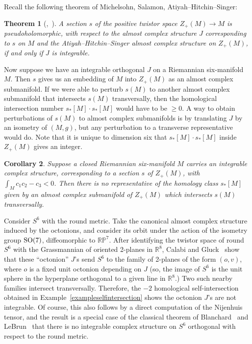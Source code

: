 \documentclass[pdftex]{sigma}%
\newcommand{\R}{\mathbb{R}}
\newcommand{\RP}{\mathbb{RP}}
\numberwithin{equation}{section}
\newtheorem{Theorem}{Theorem}[section]
\newtheorem{Corollary}[Theorem]{Corollary}
\begin{document}
Recall the following theorem of Michelsohn, Salamon, Atiyah--Hitchin--Singer:

\begin{Theorem}[{\cite[Theorem~9.11]{LM}\label{sectiontheorem},~\cite[Theorem~1]{Sa95}}] A section $s$ of the positive twistor space $Z_+(M) \to M$ is pseudoholomorphic, with respect to the almost complex structure $J$ corresponding to $s$ on $M$ and the Atiyah--Hitchin--Singer almost complex structure on $Z_+(M)$, if and only if $J$ is integrable. \end{Theorem}

Now suppose we have an integrable orthogonal $J$ on a Riemannian six-manifold $M$. Then $s$ gives us an embedding of $M$ into $Z_+(M)$ as an almost complex submanifold. If we were able to perturb $s(M)$ to another almost complex submanifold that intersects $s(M)$ transversally, then the homological intersection number $s_*[M] \cdot s_*[M]$ would have to be $\geq 0$. A way to obtain perturbations of $s(M)$ to almost complex submanifolds is by translating $J$ by an isometry of $(M,g)$, but any perturbation to a transverse representative would do. Note that it is unique to dimension six that $s_*[M] \cdot s_*[M]$ inside $Z_+(M)$ gives an integer.

\begin{Corollary}\label{deform} Suppose a closed Riemannian six-manifold $M$ carries an integrable complex structure, corresponding to a section $s$ of $Z_+(M)$, with $\int_M c_1c_2 - c_3 < 0$. Then there is no representative of the homology class $s_*[M]$ given by an almost complex submanifold of $Z_+(M)$ which intersects $s(M)$ transversally. \end{Corollary}

\begin{Example}
Consider $S^6$ with the round metric. Take the canonical almost complex structure induced by the octonions, and consider its orbit under the action of the isometry group ${\rm SO}(7)$, diffeomorphic to $\RP^7$. After identifying the twistor space of round $S^6$ with the Grassmannian of oriented 2-planes in $\R^8$, Calabi and Gluck~\cite{CG} show that these ``octonion'' $J$'s send $S^6$ to the family of 2-planes of the form $(o, v)$, where $o$ is a fixed unit octonion depending on $J$ (so, the image of $S^6$ is the unit sphere in the hyperplane orthogonal to a given line in $\R^8$.) Two such nearby families intersect transversally. Therefore, the $-2$ homological self-intersection obtained in Example~\ref{exampleselfintersection} shows the octonion $J$'s are not integrable. Of course, this also follows by a direct computation of the Nijenhuis tensor, and the result is a special case of the classical theorem of Blanchard~\cite{Bl53} and LeBrun~\cite{Le87} that there is no integrable complex structure on $S^6$ orthogonal with respect to the round metric.
\end{Example}
\end{document}
